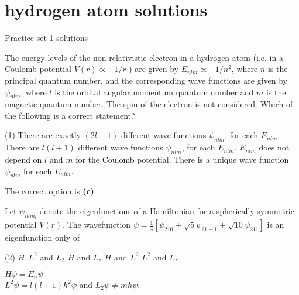 \chapter{hydrogen atom solutions}
\begin{abox}
	Practice set 1 solutions
	\end{abox}
\begin{enumerate}
\begin{minipage}{\textwidth}
	\item The energy levels of the non-relativistic electron in a hydrogen atom (i.e. in a Coulomb potential $V(r) \propto-1 / r$ ) are given by $E_{n l m} \propto-1 / n^{2}$, where $n$ is the principal quantum number, and the corresponding wave functions are given by $\psi_{n l m}$, where $l$ is the orbital angular momentum quantum number and $m$ is the magnetic quantum number. The spin of the electron is not considered. Which of the following is a correct statement?
\end{minipage}
\begin{tasks}(1)
	\task[\textbf{A.}] There are exactly $(2 l+1)$ different wave functions $\psi_{n l m}$, for each $E_{n l m}$.
	\task[\textbf{B.}]There are $l(l+1)$ different wave functions $\psi_{n l m}$, for each $E_{n l m}$.
	\task[\textbf{C.}] $E_{n l m}$ does not depend on $l$ and $m$ for the Coulomb potential.
	\task[\textbf{D.}]There is a unique wave function $\psi_{n l m}$ for each $E_{n l m}$.
\end{tasks}
\begin{answer}
	The correct option is \textbf{(c)}
\end{answer}
\begin{minipage}{\textwidth}
	\item Let $\psi_{n l m_{l}}$ denote the eigenfunctions of a Hamiltonian for a spherically symmetric potential $V(r)$. The wavefunction $\psi=\frac{1}{4}\left[\psi_{210}+\sqrt{5} \psi_{21-1}+\sqrt{10} \psi_{211}\right]$ is an eigenfunction only of
\end{minipage}
\begin{tasks}(2)
	\task[\textbf{A.}] $H, L^{2}$ and $L_{2}$
	\task[\textbf{B.}]$H$ and $L_{z}$
	\task[\textbf{C.}]$H$ and $L^{2}$
	\task[\textbf{D.}]$L^{2}$ and $L_{z}$
\end{tasks}
\begin{answer}
	$H \psi=E_{n} \psi$\\
	$L^{2} \psi=l(l+1) \hbar^{2} \psi$ and $L_{2} \psi \neq m \hbar \psi$.\\

\end{answer}
\end{enumerate}
